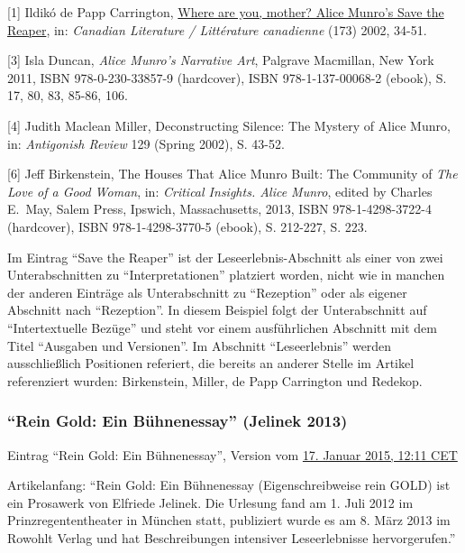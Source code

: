 \documentclass[fontsize=12pt]{scrartcl}
\begin{document}
{\tiny[1] Ildik\'{o} de Papp Carrington, \href{http://canlit.ca/site/getPDF/article/10625}{Where are you, mother? Alice Munro's Save the Reaper}, in: \textit{Canadian Literature / Litt\'{e}rature canadienne} (173) 2002, 34-51.\par}
{\tiny[3] Isla Duncan, \textit{Alice Munro's Narrative Art}, Palgrave Macmillan, New York 2011, ISBN 978-0-230-33857-9 (hardcover), ISBN 978-1-137-00068-2 (ebook), S. 17, 80, 83, 85-86, 106.\par}
{\tiny[4] Judith Maclean Miller, Deconstructing Silence: The Mystery of Alice Munro, in: \textit{Antigonish Review} 129 (Spring 2002), S. 43-52.\par}
{\tiny[6] Jeff Birkenstein, The Houses That Alice Munro Built: The Community of \textit{The Love of a Good Woman}, in: \textit{Critical Insights. Alice Munro}, edited by Charles E. May, Salem Press, Ipswich, Massachusetts, 2013, ISBN 978-1-4298-3722-4 (hardcover), ISBN 978-1-4298-3770-5 (ebook), S. 212-227, S. 223.\par}

\onehalfspacing

Im Eintrag "`Save the Reaper"' ist der Leseerlebnis-Abschnitt als einer von zwei Unterabschnitten zu "`Interpretationen"' platziert worden, nicht wie in manchen der anderen Eintr\"age als Unterabschnitt zu "`Rezeption"' oder als eigener Abschnitt nach "`Rezeption"'. In diesem Beispiel folgt der Unterabschnitt auf "`Intertextuelle Bez\"uge"' und steht vor einem ausf\"uhrlichen Abschnitt mit dem Titel "`Ausgaben und Versionen"'. Im Abschnitt "`Leseerlebnis"' werden ausschlie{\ss}lich Positionen referiert, die bereits an an\-de\-rer Stelle im Artikel referenziert wurden: Birkenstein, Miller, de Papp Carrington und Redekop.

\singlespacing
\subsubsection{"`Rein Gold: Ein B\"uhnenessay"' (Jelinek 2013)}
\label{subsubsec:6.1.9}

Eintrag "`Rein Gold: Ein B\"uhnenessay"', Version vom \href{https://de.wikipedia.org/w/index.php?title=Rein_Gold:_Ein_B\%C3\%BChnenessay\&oldid=137866703}{17. Januar 2015, 12:11 CET}

Artikelanfang: "`Rein Gold: Ein B\"uhnenessay (Eigenschreibweise rein GOLD) ist ein Prosawerk von Elfriede Jelinek. Die Urlesung fand am 1. Juli 2012 im Prinzregententheater in M\"unchen statt, pu\-bli\-ziert wurde es am 8. M\"arz 2013 im Rowohlt Verlag und hat Beschreibungen intensiver Leseerlebnisse hervorgerufen."'
\end{document}
